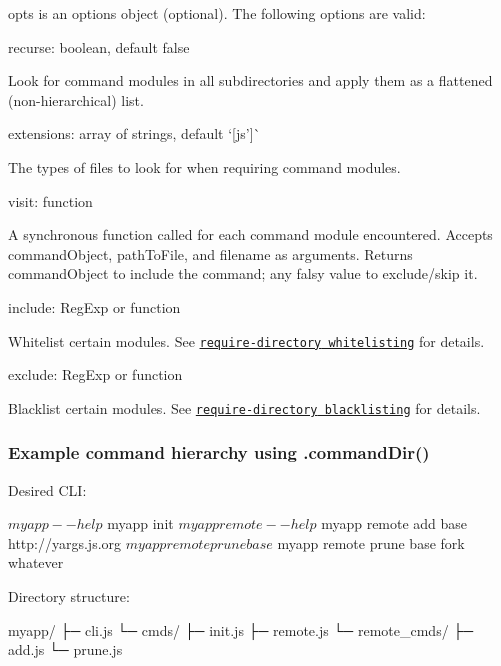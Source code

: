 {\ttfamily opts} is an options object (optional). The following options are valid\+:


\begin{DoxyItemize}
\item {\ttfamily recurse}\+: boolean, default {\ttfamily false}

Look for command modules in all subdirectories and apply them as a flattened (non-\/hierarchical) list.
\item {\ttfamily extensions}\+: array of strings, default `\mbox{[}\textquotesingle{}js'\mbox{]}\`{}

The types of files to look for when requiring command modules.
\item {\ttfamily visit}\+: function

A synchronous function called for each command module encountered. Accepts {\ttfamily command\+Object}, {\ttfamily path\+To\+File}, and {\ttfamily filename} as arguments. Returns {\ttfamily command\+Object} to include the command; any falsy value to exclude/skip it.
\item {\ttfamily include}\+: Reg\+Exp or function

Whitelist certain modules. See \href{https://www.npmjs.com/package/require-directory#whitelisting}{\tt {\ttfamily require-\/directory} whitelisting} for details.
\item {\ttfamily exclude}\+: Reg\+Exp or function

Blacklist certain modules. See \href{https://www.npmjs.com/package/require-directory#blacklisting}{\tt {\ttfamily require-\/directory} blacklisting} for details.
\end{DoxyItemize}

\subsubsection*{Example command hierarchy using {\ttfamily .command\+Dir()}}

Desired C\+LI\+:


\begin{DoxyCode}
$ myapp --help
$ myapp init
$ myapp remote --help
$ myapp remote add base http://yargs.js.org
$ myapp remote prune base
$ myapp remote prune base fork whatever
\end{DoxyCode}


Directory structure\+:


\begin{DoxyCode}
myapp/
├─ cli.js
└─ cmds/
   ├─ init.js
   ├─ remote.js
   └─ remote\_cmds/
      ├─ add.js
      └─ prune.js
\end{DoxyCode}


